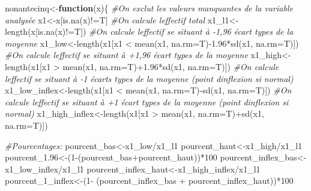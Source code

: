 \documentclass[
]{book}
\newenvironment{Shaded}{\begin{snugshade}}{\end{snugshade}}
\newcommand{\AttributeTok}[1]{\textcolor[rgb]{0.77,0.63,0.00}{#1}}
\newcommand{\CommentTok}[1]{\textcolor[rgb]{0.56,0.35,0.01}{\textit{#1}}}
\newcommand{\ControlFlowTok}[1]{\textcolor[rgb]{0.13,0.29,0.53}{\textbf{#1}}}
\newcommand{\DecValTok}[1]{\textcolor[rgb]{0.00,0.00,0.81}{#1}}
\newcommand{\FloatTok}[1]{\textcolor[rgb]{0.00,0.00,0.81}{#1}}
\newcommand{\FunctionTok}[1]{\textcolor[rgb]{0.00,0.00,0.00}{#1}}
\newcommand{\NormalTok}[1]{#1}
\newcommand{\OtherTok}[1]{\textcolor[rgb]{0.56,0.35,0.01}{#1}}
\newcommand{\SpecialCharTok}[1]{\textcolor[rgb]{0.00,0.00,0.00}{#1}}
\begin{document}
\begin{Shaded}
\begin{Highlighting}[]
\NormalTok{nonantecinq}\OtherTok{\textless{}{-}}\ControlFlowTok{function}\NormalTok{(x)\{}
  \CommentTok{\#On exclut les valeurs manquantes de la variable analysée}
\NormalTok{  x1}\OtherTok{\textless{}{-}}\NormalTok{x[}\FunctionTok{is.na}\NormalTok{(x)}\SpecialCharTok{!=}\NormalTok{T]}
  \CommentTok{\#On calcule l\textquotesingle{}effectif total}
\NormalTok{  x1\_l1}\OtherTok{\textless{}{-}}\FunctionTok{length}\NormalTok{(x[}\FunctionTok{is.na}\NormalTok{(x)}\SpecialCharTok{!=}\NormalTok{T])}
  \CommentTok{\#On calcule l\textquotesingle{}effectif se situant à {-}1,96 écart types de la moyenne}
\NormalTok{  x1\_low}\OtherTok{\textless{}{-}}\FunctionTok{length}\NormalTok{(x1[x1 }\SpecialCharTok{\textless{}} \FunctionTok{mean}\NormalTok{(x1, }\AttributeTok{na.rm=}\NormalTok{T)}\SpecialCharTok{{-}}\FloatTok{1.96}\SpecialCharTok{*}\FunctionTok{sd}\NormalTok{(x1, }\AttributeTok{na.rm=}\NormalTok{T)])}
  \CommentTok{\#On calcule l\textquotesingle{}effectif se situant à +1,96 écart types de la moyenne}
\NormalTok{  x1\_high}\OtherTok{\textless{}{-}}\FunctionTok{length}\NormalTok{(x1[x1 }\SpecialCharTok{\textgreater{}} \FunctionTok{mean}\NormalTok{(x1, }\AttributeTok{na.rm=}\NormalTok{T)}\SpecialCharTok{+}\FloatTok{1.96}\SpecialCharTok{*}\FunctionTok{sd}\NormalTok{(x1, }\AttributeTok{na.rm=}\NormalTok{T)])}
  \CommentTok{\#On calcule l\textquotesingle{}effectif se situant à {-}1 écarts types de la moyenne (point d\textquotesingle{}inflexion si normal)}
\NormalTok{  x1\_low\_inflex}\OtherTok{\textless{}{-}}\FunctionTok{length}\NormalTok{(x1[x1 }\SpecialCharTok{\textless{}} \FunctionTok{mean}\NormalTok{(x1, }\AttributeTok{na.rm=}\NormalTok{T)}\SpecialCharTok{{-}}\FunctionTok{sd}\NormalTok{(x1, }\AttributeTok{na.rm=}\NormalTok{T)])}
  \CommentTok{\#On calcule l\textquotesingle{}effectif se situant à +1 écart types de la moyenne (point d\textquotesingle{}inflexion si normal)}
\NormalTok{  x1\_high\_inflex}\OtherTok{\textless{}{-}}\FunctionTok{length}\NormalTok{(x1[x1 }\SpecialCharTok{\textgreater{}} \FunctionTok{mean}\NormalTok{(x1, }\AttributeTok{na.rm=}\NormalTok{T)}\SpecialCharTok{+}\FunctionTok{sd}\NormalTok{(x1, }\AttributeTok{na.rm=}\NormalTok{T)])}
  
  \CommentTok{\#Pourcentages:}
\NormalTok{  pourcent\_bas}\OtherTok{\textless{}{-}}\NormalTok{x1\_low}\SpecialCharTok{/}\NormalTok{x1\_l1}
\NormalTok{  pourcent\_haut}\OtherTok{\textless{}{-}}\NormalTok{x1\_high}\SpecialCharTok{/}\NormalTok{x1\_l1}
\NormalTok{  pourcent\_1}\FloatTok{.96}\OtherTok{\textless{}{-}}\NormalTok{(}\DecValTok{1}\SpecialCharTok{{-}}\NormalTok{(pourcent\_bas}\SpecialCharTok{+}\NormalTok{pourcent\_haut))}\SpecialCharTok{*}\DecValTok{100}
\NormalTok{  pourcent\_inflex\_bas}\OtherTok{\textless{}{-}}\NormalTok{x1\_low\_inflex}\SpecialCharTok{/}\NormalTok{x1\_l1}
\NormalTok{  pourcent\_inflex\_haut}\OtherTok{\textless{}{-}}\NormalTok{x1\_high\_inflex}\SpecialCharTok{/}\NormalTok{x1\_l1}
\NormalTok{  pourcent\_1\_inflex}\OtherTok{\textless{}{-}}\NormalTok{(}\DecValTok{1}\SpecialCharTok{{-}}\NormalTok{ (pourcent\_inflex\_bas }\SpecialCharTok{+}\NormalTok{ pourcent\_inflex\_haut))}\SpecialCharTok{*}\DecValTok{100}
  

\end{Highlighting}
\end{Shaded}
\end{document}
